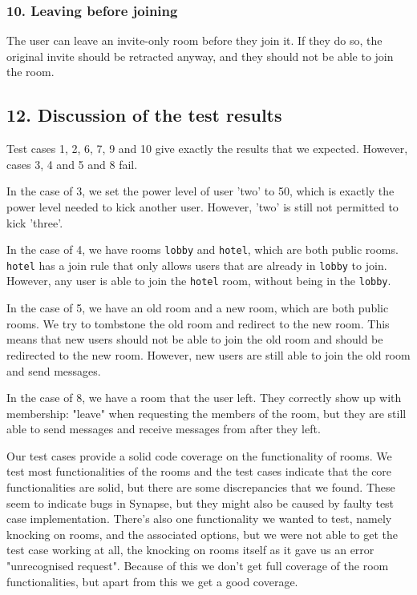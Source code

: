 \documentclass{article}
\begin{document}
\subsubsection*{10. Leaving before joining}
The user can leave an invite-only room before they join it. If they do so, the original invite should be retracted anyway, and they should not be able to join the room. 

\subsection*{12. Discussion of the test results}
Test cases 1, 2, 6, 7, 9 and 10 give exactly the results that we expected. However, cases 3, 4 and 5 and 8 fail.

In the case of 3, we set the power level of user 'two' to 50, which is exactly the power level needed to kick another user. However, 'two' is still not permitted to kick 'three'.

In the case of 4, we have rooms \texttt{lobby} and \texttt{hotel}, which are both public rooms. \texttt{hotel} has a join rule that only allows users that are already in \texttt{lobby} to join. However, any user is able to join the \texttt{hotel} room, without being in the \texttt{lobby}.

In the case of 5, we have an old room and a new room, which are both public rooms. We try to tombstone the old room and redirect to the new room. This means that new users should not be able to join the old room and should be redirected to the new room. However, new users are still able to join the old room and send messages.

In the case of 8, we have a room that the user left. They correctly show up with membership: "leave" when requesting the members of the room, but they are still able to send messages and receive messages from after they left. 

Our test cases provide a solid code coverage on the functionality of rooms. We test most functionalities of the rooms and the test cases indicate that the core functionalities are solid, but there are some discrepancies that we found. These seem to indicate bugs in Synapse, but they might also be caused by faulty test case implementation. There's also one functionality we wanted to test, namely knocking on rooms, and the associated options, but we were not able to get the test case working at all, the knocking on rooms itself as it gave us an error "unrecognised request". Because of this we don't get full coverage of the room functionalities, but apart from this we get a good coverage.
\end{document}

